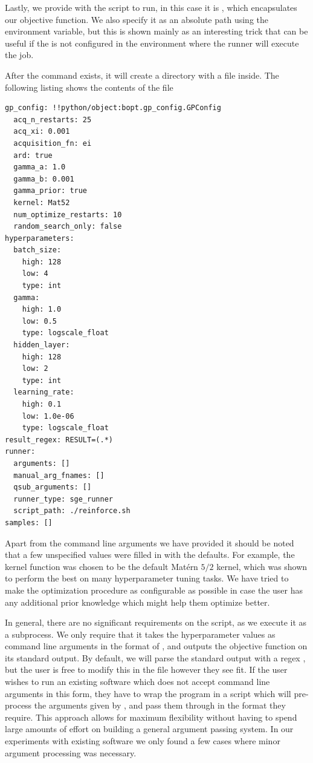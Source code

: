 Lastly, we provide \bopt with the script to run, in this case it is , which encapsulates our objective function. We also specify it as an absolute path using the  environment variable, but this is shown mainly as an interesting trick that can be useful if the  is not configured in the environment where the runner will execute the job.

After the command exists, it will create a directory  with a  file inside. The following listing shows the contents of the file

\begin{center}
\begin{verbatim}
gp_config: !!python/object:bopt.gp_config.GPConfig
  acq_n_restarts: 25
  acq_xi: 0.001
  acquisition_fn: ei
  ard: true
  gamma_a: 1.0
  gamma_b: 0.001
  gamma_prior: true
  kernel: Mat52
  num_optimize_restarts: 10
  random_search_only: false
hyperparameters:
  batch_size:
    high: 128
    low: 4
    type: int
  gamma:
    high: 1.0
    low: 0.5
    type: logscale_float
  hidden_layer:
    high: 128
    low: 2
    type: int
  learning_rate:
    high: 0.1
    low: 1.0e-06
    type: logscale_float
result_regex: RESULT=(.*)
runner:
  arguments: []
  manual_arg_fnames: []
  qsub_arguments: []
  runner_type: sge_runner
  script_path: ./reinforce.sh
samples: []
\end{verbatim}
\end{center}

Apart from the command line arguments we have provided it should be noted that a few unspecified values were filled in with the defaults. For example, the kernel function was chosen to be the default Mat\'ern $5/2$ kernel, which was shown \citep{snoek2012practical} to perform the best on many hyperparameter tuning tasks. We have tried to make the optimization procedure as configurable as possible in case the user has any additional prior knowledge which might help them optimize better.

In general, there are no significant requirements on the script, as we execute it as a subprocess. We only require that it takes the hyperparameter values as command line arguments in the format of , and outputs the objective function on its standard output. By default, we will parse the standard output with a regex , but the user is free to modify this in the  file however they see fit. If the user wishes to run an existing software which does not accept command line arguments in this form, they have to wrap the program in a script which will pre-process the arguments given by \bopt, and pass them through in the format they require. This approach allows for maximum flexibility without having to spend large amounts of effort on building a general argument passing system. In our experiments with existing software we only found a few cases where minor argument processing was necessary.


